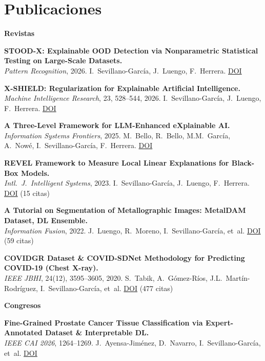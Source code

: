 \documentclass[10pt,a4paper]{article}
\newcommand{\blueitem}[1]{\textcolor{subtitleblue}{\textbf{#1}}}
\newcommand{\sub}[1]{\textcolor{subtle}{\footnotesize #1}}
\begin{document}
\section*{Publicaciones}

\footnotesize

\blueitem{Revistas}

\textbf{STOOD-X: Explainable OOD Detection via Nonparametric Statistical Testing on Large-Scale Datasets.} \\
\sub{\textit{Pattern Recognition}, 2026. I.~Sevillano-García, J.~Luengo, F.~Herrera. \href{https://doi.org/10.1016/j.patcog.2026.113254}{DOI}}

\textbf{X-SHIELD: Regularization for Explainable Artificial Intelligence.} \\
\sub{\textit{Machine Intelligence Research}, 23, 528--544, 2026. I.~Sevillano-García, J.~Luengo, F.~Herrera. \href{https://doi.org/10.1007/s11633-025-1576-y}{DOI}}

\textbf{A Three-Level Framework for LLM-Enhanced eXplainable AI.} \\
\sub{\textit{Information Systems Frontiers}, 2025. M.~Bello, R.~Bello, M.M.~García, A.~Nowé, I.~Sevillano-García, F.~Herrera. \href{https://doi.org/10.1007/s10796-025-10668-1}{DOI}}

\textbf{REVEL Framework to Measure Local Linear Explanations for Black-Box Models.} \\
\sub{\textit{Intl.~J.~Intelligent Systems}, 2023. I.~Sevillano-García, J.~Luengo, F.~Herrera. \href{https://doi.org/10.1155/2023/8068569}{DOI} \quad (15 citas)}

\textbf{A Tutorial on Segmentation of Metallographic Images: MetalDAM Dataset, DL Ensemble.} \\
\sub{\textit{Information Fusion}, 2022. J.~Luengo, R.~Moreno, I.~Sevillano-García, et~al. \href{https://doi.org/10.1016/j.inffus.2021.09.018}{DOI} \quad (59 citas)}

\textbf{COVIDGR Dataset \& COVID-SDNet Methodology for Predicting COVID-19 (Chest X-ray).} \\
\sub{\textit{IEEE JBHI}, 24(12), 3595--3605, 2020. S.~Tabik, A.~Gómez-Ríos, J.L.~Martín-Rodríguez, I.~Sevillano-García, et~al. \href{https://doi.org/10.1109/JBHI.2020.3037127}{DOI} \quad (477 citas)}

\blueitem{Congresos}

\textbf{Fine-Grained Prostate Cancer Tissue Classification via Expert-Annotated Dataset \& Interpretable DL.} \\
\sub{\textit{IEEE CAI 2026}, 1264--1269. J.~Ayensa-Jiménez, D.~Navarro, I.~Sevillano-García, et~al. \href{https://doi.org/10.1109/CAI68641.2026.11536250}{DOI}}
\end{document}
